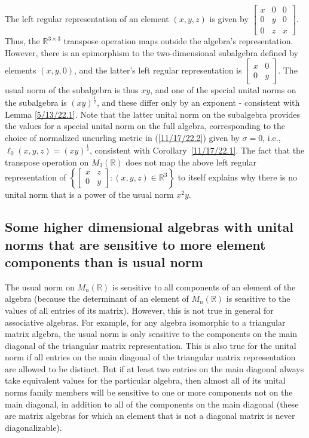 \documentclass{amsart}
\numberwithin{equation}{section}
\theoremstyle{definition}
\numberwithin{theorem}{section}
\begin{document}
The left regular representation of an element $(x,y,z)$ is given by $\left[\begin{array}{ccc}
x & 0 & 0   \\
 0 & y & 0 \\ 0 & z & x    
\end{array} \right]$.  Thus, the $\mathbb{R}^{3\times 3}$ transpose operation maps outside the algebra's representation.  However, there is an epimorphism to the two-dimensional subalgebra defined by elements $(x,y,0)$, and the latter's left regular representation is 
 $\left[\begin{array}{ccc}
x & 0  \\
 0 & y  
\end{array} \right]$.  The usual norm of the subalgebra is thus $xy$, and one of the special unital norms on the subalgebra is $(xy)^{\frac{1}{2}}$, and these differ only by an exponent - consistent with Lemma \ref{5/13/22.1}.   Note that the latter unital norm on the subalgebra provides the values for a special unital norm on the full algebra, corresponding to the choice of normalized uncurling metric in (\ref{11/17/22.2}) given by $\sigma = 0$, i.e., $\ell_0(x,y,z) = (xy)^{\frac{1}{2}}$, consistent with \mbox{Corollary \ref{11/17/22.1}}.  The fact that the transpose operation on $M_3(\mathbb{R})$ does not map the above left regular representation of $\left\{\left[\begin{array}{ccc}
x & z  \\
 0 & y  
\end{array} \right]:(x,y,z)\in \mathbb{R}^3\right\}$ to itself explains why there is no unital norm that is a power of the usual norm $x^2y$.
  
\subsection{Some higher dimensional algebras with unital norms that are sensitive to more element components than is  usual norm}

The usual norm on $ M_n(\mathbb{R})$ is sensitive to all components of an element of the algebra (because the determinant of an element of $M_n(\mathbb{R})$  is sensitive to the values of all entries of its matrix).    However, this is not true in general for associative algebras.  For example, for any algebra isomorphic to a triangular matrix algebra, the usual norm is only sensitive to the components on the main diagonal of the triangular matrix representation.  This is also true for the unital norm if all entries on the main diagonal of the triangular matrix representation are allowed to be distinct.  But if  at least two entries on the main diagonal always take equivalent values for the particular algebra,  then almost all of its unital norms family members will be sensitive to one or more components not on the main diagonal, in addition to all of the components on the main diagonal (these are matrix algebras for which an element that is not a diagonal matrix is never diagonalizable).  
\end{document}
